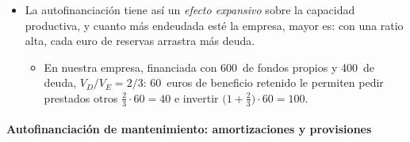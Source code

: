 \documentclass[11pt]{article}
\begin{document}
\begin{itemize}
\begin{itemize}
\begin{itemize}
    \begin{equation}\label{eq:multiplicador}
    \Delta(\text{recursos totales})=\Delta V_E+\underbrace{\Delta V_D}_{=\frac{V_D}{V_E}\,\Delta V_E}=\Big(1+\frac{V_D}{V_E}\Big)\,\Delta V_E.
    \end{equation}
    \end{itemize}
  \end{itemize}
\item La autofinanciación tiene así un \emph{efecto expansivo} sobre la capacidad productiva, y cuanto más endeudada esté la empresa, mayor es: con una ratio alta, cada euro de reservas arrastra más deuda.
  \begin{itemize}
  \item En nuestra empresa, financiada con 600~de fondos propios y 400~de deuda, $V_D/V_E=2/3$: 60~euros de beneficio retenido le permiten pedir prestados otros $\tfrac23\cdot60=40$ e invertir $\big(1+\tfrac23\big)\cdot60=100$.
  \end{itemize}
\end{itemize}

\paragraph{Autofinanciación de mantenimiento: amortizaciones y provisiones}
\end{document}
